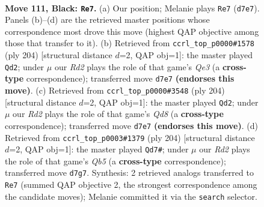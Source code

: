 \documentclass[11pt]{article}
\begin{document}
\begin{figure}[p]\centering
\begin{subfigure}{0.46\textwidth}\centering
\resizebox{\linewidth}{!}{%
\newchessgame
\chessboard[
  setfen={8/3r4/6K1/8/6k1/8/8/8 b - - 7 111},
  showmover=false,
  pgfstyle=straightmove, color=movearrow, markmove={d7-e7}
]}
\caption{}
\end{subfigure}\hfill
\begin{subfigure}{0.46\textwidth}\centering
\resizebox{\linewidth}{!}{%
\newchessgame
\chessboard[
  setfen={8/8/8/8/8/4Q3/8/1k1K4 w - - 8 103},
  showmover=false,
  pgfstyle=straightmove, color=movearrow, markmove={e3-d2}
]}
\caption{}
\end{subfigure}
\\[4pt]
\begin{subfigure}{0.46\textwidth}\centering
\resizebox{\linewidth}{!}{%
\newchessgame
\chessboard[
  setfen={3Q4/8/8/8/2K5/k7/8/8 w - - 6 103},
  showmover=false,
  pgfstyle=straightmove, color=movearrow, markmove={d8-d2}
]}
\caption{}
\end{subfigure}\hfill
\begin{subfigure}{0.46\textwidth}\centering
\resizebox{\linewidth}{!}{%
\newchessgame
\chessboard[
  setfen={3k4/8/3K4/1Q6/8/8/8/8 w - - 13 103},
  showmover=false,
  pgfstyle=straightmove, color=movearrow, markmove={b5-d7}
]}
\caption{}
\end{subfigure}
\caption{\textbf{Move 111, Black: \texttt{Re7}.} (a) Our position; Melanie plays \texttt{Re7} (\texttt{d7e7}). Panels (b)--(d) are the retrieved master positions whose correspondence most drove this move (highest QAP objective among those that transfer to it). (b) Retrieved from \texttt{ccrl\_top\_p0000\#1578} (ply 204) [structural distance $d$=2, QAP obj=1]: the master played \texttt{Qd2}; under $\mu$ our \emph{Rd2} plays the role of that game's \emph{Qe3} (a \textbf{cross-type} correspondence); transferred move \texttt{d7e7} \textbf{(endorses this move)}. (c) Retrieved from \texttt{ccrl\_top\_p0000\#3548} (ply 204) [structural distance $d$=2, QAP obj=1]: the master played \texttt{Qd2}; under $\mu$ our \emph{Rd2} plays the role of that game's \emph{Qd8} (a \textbf{cross-type} correspondence); transferred move \texttt{d7e7} \textbf{(endorses this move)}. (d) Retrieved from \texttt{ccrl\_top\_p0003\#1379} (ply 204) [structural distance $d$=2, QAP obj=1]: the master played \texttt{Qd7\#}; under $\mu$ our \emph{Rd2} plays the role of that game's \emph{Qb5} (a \textbf{cross-type} correspondence); transferred move \texttt{d7g7}. Synthesis: 2 retrieved analogs transferred to \texttt{Re7} (summed QAP objective 2, the strongest correspondence among the candidate moves); Melanie committed it via the \texttt{search} selector.}
\label{fig:thought-m221}
\end{figure}
\end{document}
